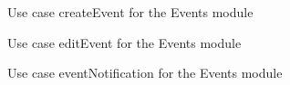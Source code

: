 \documentclass{article}
\begin{document}
			\begin{figure}[H]
				
				\caption{Use case createEvent for the Events module}
				
			\end{figure}
		
			\begin{figure}[H]
				
				\caption{Use case editEvent for the Events module}
				
			\end{figure}
		
			\begin{figure}[H]
				
				\caption{Use case eventNotification for the Events module}
				
			\end{figure}
			
\end{document}
